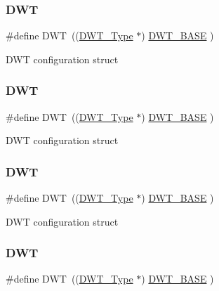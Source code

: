 \subsubsection{\texorpdfstring{DWT}{DWT}\hspace{0.1cm}{\footnotesize\ttfamily [2/8]}}
{\footnotesize\ttfamily \#define D\+WT~((\mbox{\hyperlink{struct_d_w_t___type}{D\+W\+T\+\_\+\+Type}}       $\ast$)     \mbox{\hyperlink{group___c_m_s_i_s__core__base_gafdab534f961bf8935eb456cb7700dcd2}{D\+W\+T\+\_\+\+B\+A\+SE}}         )}

D\+WT configuration struct \mbox{\label{group___c_m_s_i_s__core__base_gabbe5a060185e1d5afa3f85b14e10a6ce}} 
\subsubsection{\texorpdfstring{DWT}{DWT}\hspace{0.1cm}{\footnotesize\ttfamily [3/8]}}
{\footnotesize\ttfamily \#define D\+WT~((\mbox{\hyperlink{struct_d_w_t___type}{D\+W\+T\+\_\+\+Type}}       $\ast$)     \mbox{\hyperlink{group___c_m_s_i_s__core__base_gafdab534f961bf8935eb456cb7700dcd2}{D\+W\+T\+\_\+\+B\+A\+SE}}      )}

D\+WT configuration struct \mbox{\label{group___c_m_s_i_s__core__base_gabbe5a060185e1d5afa3f85b14e10a6ce}} 
\subsubsection{\texorpdfstring{DWT}{DWT}\hspace{0.1cm}{\footnotesize\ttfamily [4/8]}}
{\footnotesize\ttfamily \#define D\+WT~((\mbox{\hyperlink{struct_d_w_t___type}{D\+W\+T\+\_\+\+Type}}       $\ast$)     \mbox{\hyperlink{group___c_m_s_i_s__core__base_gafdab534f961bf8935eb456cb7700dcd2}{D\+W\+T\+\_\+\+B\+A\+SE}}      )}

D\+WT configuration struct \mbox{\label{group___c_m_s_i_s__core__base_gabbe5a060185e1d5afa3f85b14e10a6ce}} 
\subsubsection{\texorpdfstring{DWT}{DWT}\hspace{0.1cm}{\footnotesize\ttfamily [5/8]}}
{\footnotesize\ttfamily \#define D\+WT~((\mbox{\hyperlink{struct_d_w_t___type}{D\+W\+T\+\_\+\+Type}}       $\ast$)     \mbox{\hyperlink{group___c_m_s_i_s__core__base_gafdab534f961bf8935eb456cb7700dcd2}{D\+W\+T\+\_\+\+B\+A\+SE}}      )}

